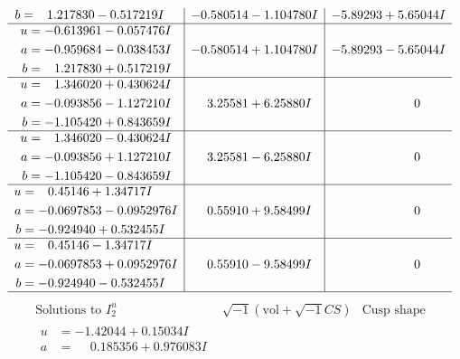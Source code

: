 \documentclass[1p]{elsarticle_modified}
\theoremstyle{definition}
\newcommand{\I}{\sqrt{-1}}
\begin{document}
$$\begin{array}{c|c|c}
\begin{aligned}
b &= \phantom{-}1.217830 - 0.517219 I\end{aligned}
 & -0.580514 - 1.104780 I & -5.89293 + 5.65044 I \\ \hline\begin{aligned}
u &= -0.613961 - 0.057476 I \\
a &= -0.959684 - 0.038453 I \\
b &= \phantom{-}1.217830 + 0.517219 I\end{aligned}
 & -0.580514 + 1.104780 I & -5.89293 - 5.65044 I \\ \hline\begin{aligned}
u &= \phantom{-}1.346020 + 0.430624 I \\
a &= -0.093856 - 1.127210 I \\
b &= -1.105420 + 0.843659 I\end{aligned}
 & \phantom{-}3.25581 + 6.25880 I & \phantom{-0.000000 } 0 \\ \hline\begin{aligned}
u &= \phantom{-}1.346020 - 0.430624 I \\
a &= -0.093856 + 1.127210 I \\
b &= -1.105420 - 0.843659 I\end{aligned}
 & \phantom{-}3.25581 - 6.25880 I & \phantom{-0.000000 } 0 \\ \hline\begin{aligned}
u &= \phantom{-}0.45146 + 1.34717 I \\
a &= -0.0697853 - 0.0952976 I \\
b &= -0.924940 + 0.532455 I\end{aligned}
 & \phantom{-}0.55910 + 9.58499 I & \phantom{-0.000000 } 0 \\ \hline\begin{aligned}
u &= \phantom{-}0.45146 - 1.34717 I \\
a &= -0.0697853 + 0.0952976 I \\
b &= -0.924940 - 0.532455 I\end{aligned}
 & \phantom{-}0.55910 - 9.58499 I & \phantom{-0.000000 } 0\\
 \hline 
 \end{array}$$\newpage$$\begin{array}{c|c|c}  
\text{Solutions to }I^u_{2}& \I (\text{vol} + \sqrt{-1}CS) & \text{Cusp shape}\\
 \hline 
\begin{aligned}
u &= -1.42044 + 0.15034 I \\
a &= \phantom{-}0.185356 + 0.976083 I \\

\end{aligned}
\end{array}$$
\end{document}
